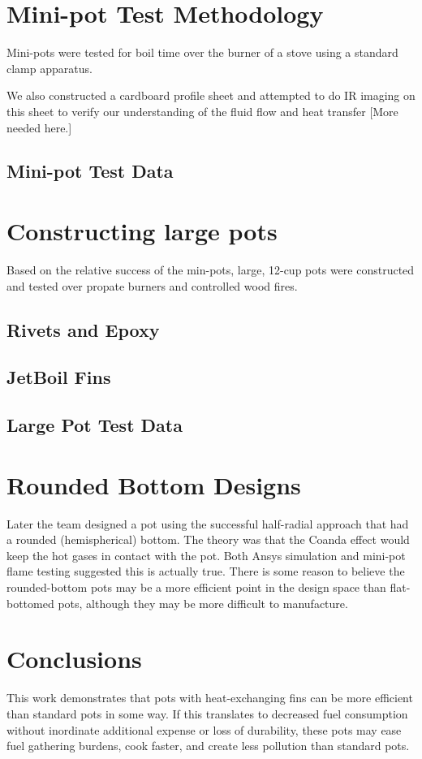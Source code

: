 \documentclass{article}
\begin{document}
\section{Mini-pot Test Methodology}

Mini-pots were tested for boil time over the burner of a stove using
a standard clamp apparatus.

We also constructed a cardboard profile sheet and attempted to do
IR imaging on this sheet to verify our understanding of the fluid flow
and heat transfer [More needed here.]

\subsection{Mini-pot Test Data}

\section{Constructing large pots}

Based on the relative success of the min-pots, large, 12-cup
pots were constructed and tested over propate burners and
controlled wood fires.

\subsection{Rivets and Epoxy}

\subsection{JetBoil Fins}

\subsection{Large Pot Test Data}

\section{Rounded Bottom Designs}

Later the team designed a pot using the successful half-radial
approach that had a rounded (hemispherical) bottom.
The theory was that the Coanda effect would keep the hot gases
in contact with the pot. Both Ansys simulation and mini-pot flame
testing suggested this is actually true.
There is some reason to believe the rounded-bottom pots may be
a more efficient point in the design space than flat-bottomed pots,
although they may be more difficult to manufacture.

\section{Conclusions}

This work demonstrates that pots with heat-exchanging fins
can be more efficient than standard pots in some way.
If this translates to decreased fuel consumption without
inordinate additional expense or loss of durability,
these pots may ease fuel gathering burdens, cook faster,
and create less pollution than standard pots.




\end{document}
